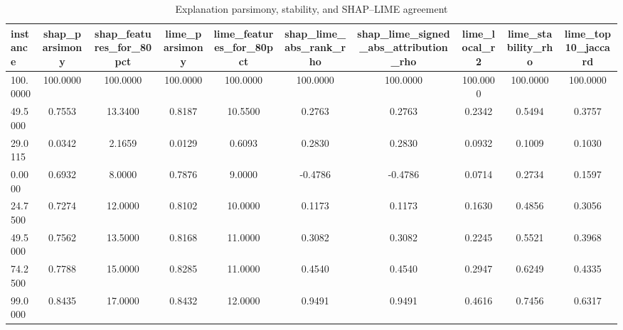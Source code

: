 \begin{table}
\centering
\caption{Explanation parsimony, stability, and SHAP--LIME agreement}
\label{tab:explanation_quality}
\begin{tabular}{lccccccccc}
\toprule
instance & shap_parsimony & shap_features_for_80pct & lime_parsimony & lime_features_for_80pct & shap_lime_abs_rank_rho & shap_lime_signed_abs_attribution_rho & lime_local_r2 & lime_stability_rho & lime_top10_jaccard \\
\midrule
100.0000 & 100.0000 & 100.0000 & 100.0000 & 100.0000 & 100.0000 & 100.0000 & 100.0000 & 100.0000 & 100.0000 \\
49.5000 & 0.7553 & 13.3400 & 0.8187 & 10.5500 & 0.2763 & 0.2763 & 0.2342 & 0.5494 & 0.3757 \\
29.0115 & 0.0342 & 2.1659 & 0.0129 & 0.6093 & 0.2830 & 0.2830 & 0.0932 & 0.1009 & 0.1030 \\
0.0000 & 0.6932 & 8.0000 & 0.7876 & 9.0000 & -0.4786 & -0.4786 & 0.0714 & 0.2734 & 0.1597 \\
24.7500 & 0.7274 & 12.0000 & 0.8102 & 10.0000 & 0.1173 & 0.1173 & 0.1630 & 0.4856 & 0.3056 \\
49.5000 & 0.7562 & 13.5000 & 0.8168 & 11.0000 & 0.3082 & 0.3082 & 0.2245 & 0.5521 & 0.3968 \\
74.2500 & 0.7788 & 15.0000 & 0.8285 & 11.0000 & 0.4540 & 0.4540 & 0.2947 & 0.6249 & 0.4335 \\
99.0000 & 0.8435 & 17.0000 & 0.8432 & 12.0000 & 0.9491 & 0.9491 & 0.4616 & 0.7456 & 0.6317 \\
\bottomrule
\end{tabular}
\end{table}
